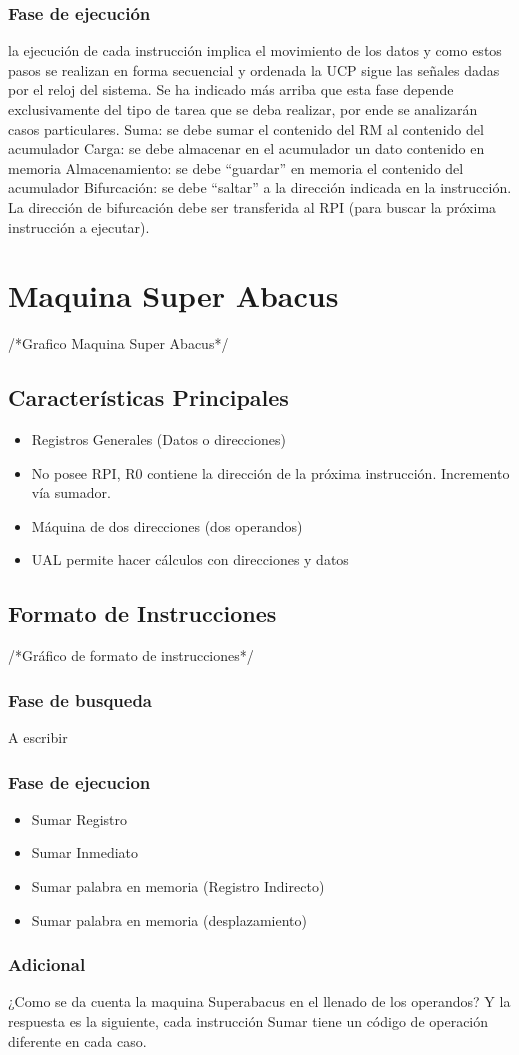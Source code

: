 \subsubsection{Fase de ejecución}
la ejecución de cada instrucción implica el movimiento de los datos y como estos pasos se realizan en forma secuencial y ordenada la UCP sigue las señales dadas por el reloj del sistema. Se ha indicado más arriba que esta fase depende exclusivamente del tipo de tarea que se deba realizar, por ende se analizarán casos particulares.
Suma: se debe sumar el contenido del RM al contenido del acumulador
Carga: se debe almacenar en el acumulador un dato contenido en memoria
Almacenamiento: se debe “guardar” en memoria el contenido del acumulador
Bifurcación: se debe “saltar” a la dirección indicada en la instrucción. La dirección de bifurcación debe ser transferida al RPI (para buscar la próxima instrucción a ejecutar).

\section{Maquina Super Abacus}
/*Grafico Maquina  Super Abacus*/
\subsection{Características Principales}
\begin{itemize}
\item Registros Generales (Datos o direcciones)
\item No posee RPI, R0 contiene la dirección de la próxima instrucción. Incremento vía sumador.
\item Máquina de dos direcciones (dos operandos)
\item UAL permite hacer cálculos con direcciones y datos
\end{itemize}

\subsection{Formato de Instrucciones}
/*Gráfico  de formato de instrucciones*/

\subsubsection{Fase de busqueda}
A escribir
\subsubsection{Fase de ejecucion}
\begin{itemize}
\item Sumar Registro
\item Sumar Inmediato
\item Sumar palabra en memoria (Registro Indirecto)
\item Sumar palabra en memoria (desplazamiento)
\end{itemize}

\subsubsection{Adicional}
¿Como se da cuenta la maquina Superabacus en el llenado de los operandos? Y la respuesta es la siguiente, cada instrucción Sumar tiene un código de operación diferente en cada caso.